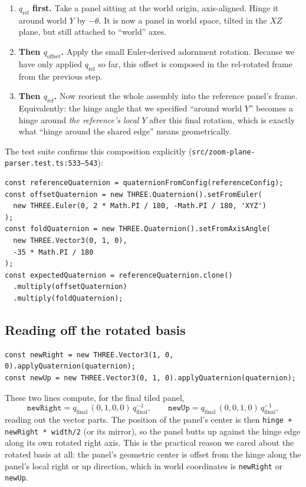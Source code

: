 \documentclass{article}
\begin{document}
\begin{enumerate}
\item \textbf{$q_{\text{rel}}$ first.} Take a panel sitting at the world
origin, axis-aligned. Hinge it around world $Y$ by $-\theta$. It is now
a panel in world space, tilted in the $XZ$ plane, but still attached to
``world'' axes.
\item \textbf{Then $q_{\text{offset}}$.} Apply the small Euler-derived
adornment rotation. Because we have only applied $q_{\text{rel}}$ so
far, this offset is composed in the rel-rotated frame from the previous
step.
\item \textbf{Then $q_{\text{ref}}$.} Now reorient the whole assembly
into the reference panel's frame. Equivalently: the hinge angle that we
specified ``around world $Y$'' becomes a hinge around \emph{the
reference's local $Y$} after this final rotation, which is exactly what
``hinge around the shared edge'' means geometrically.
\end{enumerate}

The test suite confirms this composition explicitly
(\texttt{src/zoom-plane-parser.test.ts:533--543}):

\begin{lstlisting}
const referenceQuaternion = quaternionFromConfig(referenceConfig);
const offsetQuaternion = new THREE.Quaternion().setFromEuler(
  new THREE.Euler(0, 2 * Math.PI / 180, -Math.PI / 180, 'XYZ')
);
const foldQuaternion = new THREE.Quaternion().setFromAxisAngle(
  new THREE.Vector3(0, 1, 0),
  -35 * Math.PI / 180
);
const expectedQuaternion = referenceQuaternion.clone()
  .multiply(offsetQuaternion)
  .multiply(foldQuaternion);
\end{lstlisting}

\subsection{Reading off the rotated basis}

\begin{lstlisting}
const newRight = new THREE.Vector3(1, 0, 0).applyQuaternion(quaternion);
const newUp = new THREE.Vector3(0, 1, 0).applyQuaternion(quaternion);
\end{lstlisting}

These two lines compute, for the final tiled panel,
\[
  \texttt{newRight} = q_{\text{final}}\,(0,1,0,0)\,q_{\text{final}}^{-1}, \qquad
  \texttt{newUp}    = q_{\text{final}}\,(0,0,1,0)\,q_{\text{final}}^{-1},
\]
reading out the vector parts. The position of the panel's center is
then \texttt{hinge + newRight * width/2} (or its mirror), so the panel
butts up against the hinge edge along its own rotated right axis. This
is the practical reason we cared about the rotated basis at all: the
panel's geometric center is offset from the hinge along the panel's
local right or up direction, which in world coordinates is
\texttt{newRight} or \texttt{newUp}.
\end{document}
